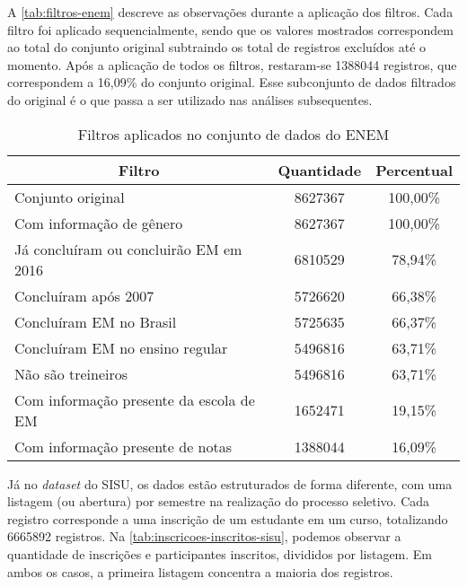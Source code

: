 A \autoref{tab:filtros-enem} descreve as observações durante a aplicação dos filtros. Cada filtro foi aplicado sequencialmente, sendo que os valores mostrados correspondem ao total do conjunto original subtraindo os total de registros excluídos até o momento. Após a aplicação de todos os filtros, restaram-se 1388044 registros, que correspondem a 16,09\% do conjunto original. Esse subconjunto de dados filtrados do original é o que passa a ser utilizado nas análises subsequentes.

\begin{table}[h]
  \begin{tabular}{lcc}
  \hline
  \multicolumn{1}{c}{\textbf{Filtro}}     & \textbf{Quantidade} & \textbf{Percentual} \\ \hline
  Conjunto original                       & 8627367             & 100,00\%            \\ \hline
  Com informação de gênero                & 8627367             & 100,00\%            \\ \hline
  Já concluíram ou concluirão EM em 2016  & 6810529             & 78,94\%             \\ \hline
  Concluíram após 2007                    & 5726620             & 66,38\%             \\ \hline
  Concluíram EM no Brasil                 & 5725635             & 66,37\%             \\ \hline
  Concluíram EM no ensino regular         & 5496816             & 63,71\%             \\ \hline
  Não são treineiros                      & 5496816             & 63,71\%             \\ \hline
  Com informação presente da escola de EM & 1652471             & 19,15\%             \\ \hline
  Com informação presente de notas        & 1388044             & 16,09\%             \\ \hline
  \end{tabular}
  \caption{Filtros aplicados no conjunto de dados do ENEM}
  \label{tab:filtros-enem}
  \end{table}

Já no \textit{dataset} do SISU, os dados estão estruturados de forma diferente, com uma listagem (ou abertura) por semestre na realização do processo seletivo. Cada registro corresponde a uma inscrição de um estudante em um curso, totalizando 6665892 registros. Na \autoref{tab:inscricoes-inscritos-sisu}, podemos observar a quantidade de inscrições e participantes inscritos, divididos por listagem. Em ambos os casos, a primeira listagem concentra a maioria dos registros.

